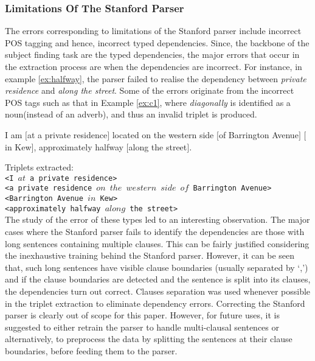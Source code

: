 \documentclass{acm_proc_article-sp}
\begin{document}
\subsubsection{Limitations Of The Stanford Parser}
\label{subsub:stanford}
The errors corresponding to limitations of the Stanford parser include incorrect POS tagging and hence, incorrect typed dependencies. Since, the backbone of the subject finding task are the typed dependencies, the major errors that occur in the extraction process are when the dependencies are incorrect. For instance, in example \ref{ex:halfway}, the parser failed to realise the dependency between \textit{private residence} and \textit{along the street}. Some of the errors originate from the incorrect POS tags such as that in Example \ref{ex:c1}, where \textit{diagonally} is identified as a noun(instead of an adverb), and thus an invalid triplet is produced. 
\begin{example}
\label{ex:halfway}
I am $[$at a private residence$]$ located on the western side $[$of Barrington Avenue$]$ $[$in Kew$]$, approximately halfway $[$along the street$]$.
\end{example}
Triplets extracted:\\
\texttt{<I $at$ a private residence>}\\
\texttt{<a private residence  $on$  $the$ $western$ $side$ $of$ Barrington Avenue>}\\
\texttt{<Barrington Avenue $in$ Kew>}\\
\texttt{<approximately halfway $along$ the street>}\\

The study of the error of these types led to an interesting observation. The major cases where the Stanford parser fails to identify the dependencies are those with long sentences containing multiple clauses. This can be fairly justified considering the inexhaustive training behind the Stanford parser. However, it can be seen that, such long sentences have visible clause boundaries (usually separated by `,') and if the clause boundaries are detected and the sentence is split into its clauses, the dependencies turn out correct. Clauses separation was used whenever possible in the triplet extraction to eliminate dependency errors. Correcting the Stanford parser is clearly out of scope for this paper. However, for future uses, it is suggested to either retrain the parser to handle multi-clausal sentences or alternatively, to preprocess the data by splitting the sentences at their clause boundaries, before feeding them to the parser.
\end{document}

